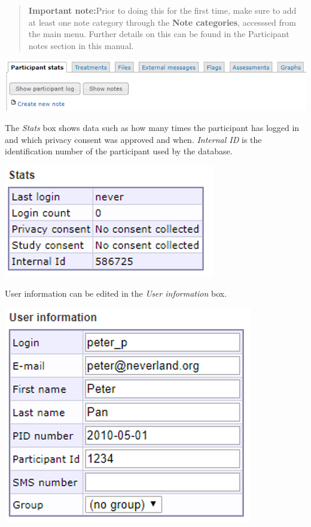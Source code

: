 \documentclass[]{book}
\begin{document}
\begin{quote}
\textbf{Important note:}Prior to doing this for the first time, make sure to add at least one note category through the \textbf{Note categories}, accesssed from the main menu. Further details on this can be found in the Participant notes section in this manual.
\end{quote}

\includegraphics{images/new-images/participantStatsLogNotes.png}

The \emph{Stats} box shows data such as how many times the participant has logged in and which privacy consent was approved and when. \emph{Internal ID} is the identification number of the participant used by the database.

\includegraphics{images/new-images/participantsStatsSmall.png}

User information can be edited in the \emph{User information} box.

\includegraphics{images/new-images/participantInfo.png}
\end{document}
